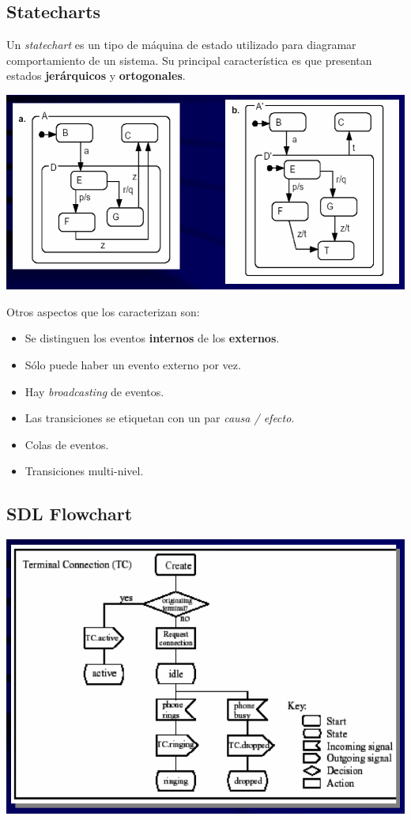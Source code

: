 \documentclass[]{article}
\begin{document}
\subsection{Statecharts}
Un \textit{statechart} es un tipo de máquina de estado utilizado para diagramar comportamiento de un sistema. Su principal característica es que presentan estados \textbf{jerárquicos} y \textbf{ortogonales}.

\begin{center}
	\includegraphics[scale=0.5]{Statechart.png}
\end{center}

Otros aspectos que los caracterizan son:
\begin{itemize}
	\item Se distinguen los eventos \textbf{internos} de los \textbf{externos}.
	\item Sólo puede haber un evento externo por vez.
	\item Hay \textit{broadcasting} de eventos.
	\item Las transiciones se etiquetan con un par \textit{causa / efecto}.
	\item Colas de eventos.
	\item Transiciones multi-nivel.
\end{itemize}

\subsection{SDL Flowchart}
\begin{center}
	\includegraphics[scale=0.6]{SDLFlowchart.png}
\end{center}
\end{document}

